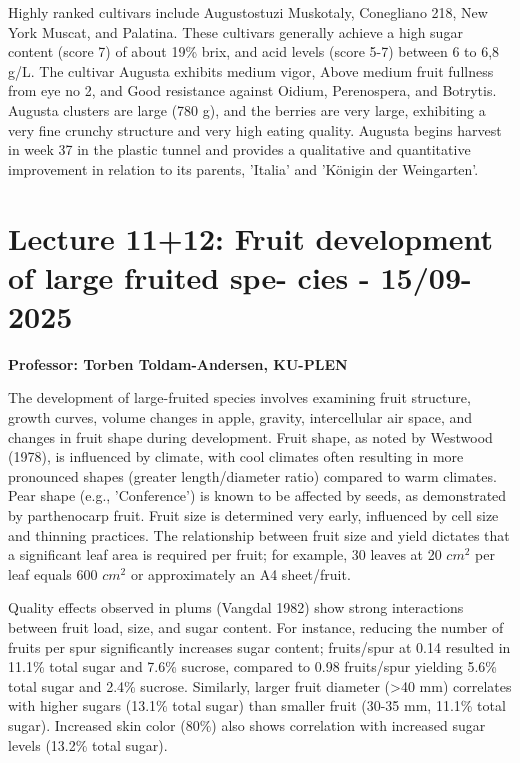 \vspace{0.5em}
Highly ranked cultivars include Augustostuzi Muskotaly, Conegliano 218, New York Muscat, and Palatina. These cultivars generally achieve a high sugar content (score 7) of about 19\% brix, and acid levels (score 5-7) between 6 to 6,8 g/L. The cultivar Augusta exhibits medium vigor, Above medium fruit fullness from eye no 2, and Good resistance against Oidium, Perenospera, and Botrytis. Augusta clusters are large (780 g), and the berries are very large, exhibiting a very fine crunchy structure and very high eating quality. Augusta begins harvest in week 37 in the plastic tunnel and provides a qualitative and quantitative improvement in relation to its parents, 'Italia' and 'Königin der Weingarten'.


\section{Lecture 11+12: Fruit development of large fruited spe- cies - 15/09-2025}
\textbf{Professor: Torben Toldam-Andersen, KU-PLEN}

\vspace{1em}
The development of large-fruited species involves examining fruit structure, growth curves, volume changes in apple, gravity, intercellular air space, and changes in fruit shape during development. Fruit shape, as noted by Westwood (1978), is influenced by climate, with cool climates often resulting in more pronounced shapes (greater length/diameter ratio) compared to warm climates. Pear shape (e.g., 'Conference') is known to be affected by seeds, as demonstrated by parthenocarp fruit. Fruit size is determined very early, influenced by cell size and thinning practices. The relationship between fruit size and yield dictates that a significant leaf area is required per fruit; for example, 30 leaves at 20 $cm^2$ per leaf equals 600 $cm^2$ or approximately an A4 sheet/fruit.

\vspace{0.5em}
Quality effects observed in plums (Vangdal 1982) show strong interactions between fruit load, size, and sugar content. For instance, reducing the number of fruits per spur significantly increases sugar content; fruits/spur at 0.14 resulted in 11.1\% total sugar and 7.6\% sucrose, compared to 0.98 fruits/spur yielding 5.6\% total sugar and 2.4\% sucrose. Similarly, larger fruit diameter (>40 mm) correlates with higher sugars (13.1\% total sugar) than smaller fruit (30-35 mm, 11.1\% total sugar). Increased skin color (80\%) also shows correlation with increased sugar levels (13.2\% total sugar).


